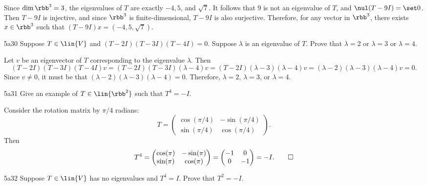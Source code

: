 \begin{sol}
    Since $\dim \rbb^3 = 3$, the eigenvalues of $T$ are exactly $-4, 5$, and $\sqrt 7$.
	It follows that 9 is not an eigenvalue of $T$, and $\nul(T - 9I) = \set 0$.
	Then $T - 9I$ is injective, and since $\rbb^3$ is finite-dimensional, $T - 9I$ is also surjective.
	Therefore, for any vector in $\rbb^3$, there exists $x \in \rbb^3$ such that $(T - 9I)x = (-4, 5, \sqrt{7})$.
\end{sol}

\begin{exercise}{5a30}
    Suppose $T \in \lin{V}$ and $(T - 2I)(T - 3I)(T - 4I) = 0$.
	Suppose $\lambda$ is an eigenvalue of $T$.
	Prove that $\lambda = 2$ or $\lambda = 3$ or $\lambda = 4$.
\end{exercise}

\begin{sol}
    Let $v$ be an eigenvector of $T$ corresponding to the eigenvalue $\lambda$.
	Then
    \[
    	(T - 2I)(T - 3I)(T - 4I)v = (T - 2I)(T - 3I)(\lambda - 4)v = (T - 2I)(\lambda - 3)(\lambda - 4)v = (\lambda - 2)(\lambda - 3)(\lambda - 4)v = 0.
    \]
    Since $v \neq 0$, it must be that $(\lambda - 2)(\lambda - 3)(\lambda - 4) = 0$.
	Therefore, $\lambda = 2$, $\lambda = 3$, or $\lambda = 4$.
\end{sol}

\begin{exercise}{5a31}
    Give an example of $T \in \lin{\rbb^2}$ such that $T^4 = -I$.
\end{exercise}

\begin{sol}
    Consider the rotation matrix by $\pi/4$ radians:
    \[
        T = 
        \begin{pmatrix}
            \cos(\pi/4) & -\sin(\pi/4) \\
            \sin(\pi/4) & \cos(\pi/4)
        \end{pmatrix}.
    \]
    Then
    \[
        T^4 = 
        \begin{pmatrix}
            \cos(\pi) & -\sin(\pi) \\
            \sin(\pi) & \cos(\pi)
        \end{pmatrix} = 
        \begin{pmatrix}
            -1 & 0 \\
            0 & -1
        \end{pmatrix} = -I. \qedhere
    \]
\end{sol}

\begin{exercise}{5a32}
    Suppose $T \in \lin{V}$ has no eigenvalues and $T^4 = I$.
	Prove that $T^2 = -I$.
    
\end{exercise}

